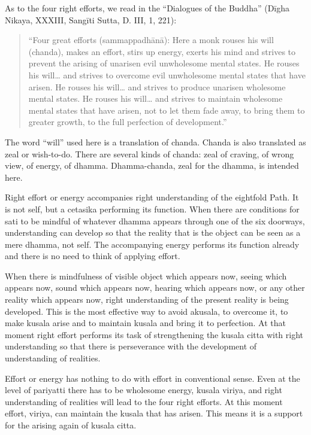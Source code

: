 As to the four right efforts, we read in the ``Dialogues of the Buddha''
(Dīgha Nikaya, XXXIII, Sangīti Sutta, D. III, 1, 221):

\begin{quote}
``Four great efforts (sammappadhānā): Here a monk rouses his will
(chanda), makes an effort, stirs up energy, exerts his mind and strives
to prevent the arising of unarisen evil unwholesome mental states. He
rouses his will\ldots{} and strives to overcome evil unwholesome
mental states that have arisen. He rouses his will\ldots{} and strives
to produce unarisen wholesome mental states. He rouses his will\ldots{}
and strives to maintain wholesome mental states that have arisen, not to
let them fade away, to bring them to greater growth, to the full
perfection of development.''
\end{quote}

The word ``will'' used here is a translation of chanda. Chanda is also
translated as zeal or wish-to-do. There are several kinds of chanda:
zeal of craving, of wrong view, of energy, of dhamma. Dhamma-chanda,
zeal for the dhamma, is intended here.

Right effort or energy accompanies right understanding of the eightfold
Path. It is not self, but a cetasika performing its function. When there
are conditions for sati to be mindful of whatever dhamma appears through
one of the six doorways, understanding can develop so that the reality
that is the object can be seen as a mere dhamma, not self. The
accompanying energy performs its function already and there is no need
to think of applying effort.

When there is mindfulness of visible object which appears now, seeing
which appears now, sound which appears now, hearing which appears now,
or any other reality which appears now, right understanding of the
present reality is being developed. This is the most effective way to
avoid akusala, to overcome it, to make kusala arise and to maintain
kusala and bring it to perfection. At that moment right effort performs
its task of strengthening the kusala citta with right understanding so
that there is perseverance with the development of understanding of
realities.

Effort or energy has nothing to do with effort in conventional sense.
Even at the level of pariyatti there has to be wholesome energy, kusala
viriya, and right understanding of realities will lead to the four
right efforts. At this moment effort, viriya, can maintain the kusala
that has arisen. This means it is a support for the arising again of
kusala citta.

